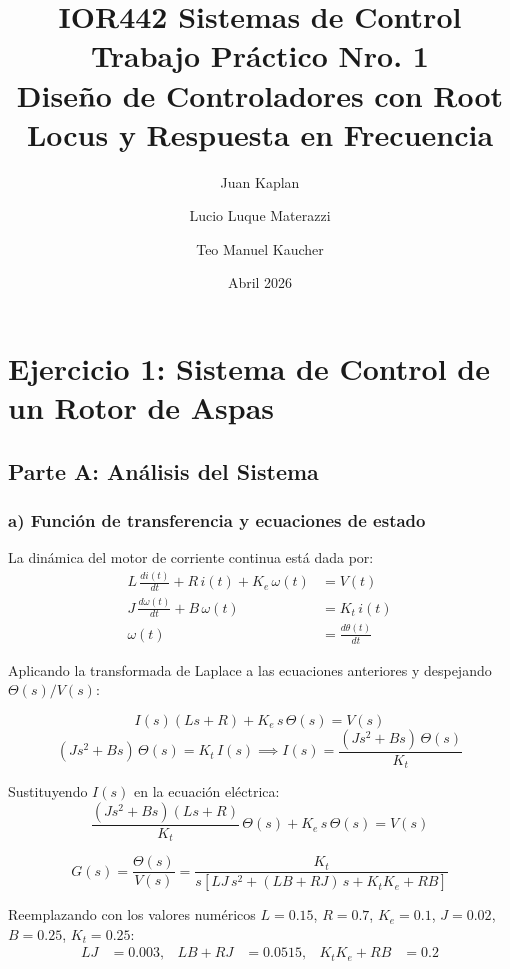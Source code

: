 \documentclass[12pt,a4paper]{article}
\title{
  \large IOR442 Sistemas de Control\\[0.5em]
  \Large \textbf{Trabajo Práctico Nro. 1}\\[0.3em]
  \large Diseño de Controladores con Root Locus y Respuesta en Frecuencia
}
\author{
  Juan Kaplan \and Lucio Luque Materazzi \and Teo Manuel Kaucher
}
\date{Abril 2026}
\begin{document}
\maketitle
\tableofcontents
\newpage

\section{Ejercicio 1: Sistema de Control de un Rotor de Aspas}

\subsection{Parte A: Análisis del Sistema}

\subsubsection*{a) Función de transferencia y ecuaciones de estado}

La dinámica del motor de corriente continua está dada por:
\begin{align}
  L\,\frac{di(t)}{dt} + R\,i(t) + K_e\,\omega(t) &= V(t) \label{eq:elec}\\
  J\,\frac{d\omega(t)}{dt} + B\,\omega(t) &= K_t\,i(t) \label{eq:mec}\\
  \omega(t) &= \frac{d\theta(t)}{dt} \label{eq:kinem}
\end{align}

Aplicando la transformada de Laplace a las ecuaciones anteriores y despejando $\Theta(s)/V(s)$:

\[
  I(s)(Ls + R) + K_e\,s\,\Theta(s) = V(s)
\]
\[
  (Js^2 + Bs)\,\Theta(s) = K_t\,I(s) \implies I(s) = \frac{(Js^2+Bs)\,\Theta(s)}{K_t}
\]

Sustituyendo $I(s)$ en la ecuación eléctrica:
\[
  \frac{(Js^2+Bs)(Ls+R)}{K_t}\,\Theta(s) + K_e\,s\,\Theta(s) = V(s)
\]

\[
  \boxed{G(s) = \frac{\Theta(s)}{V(s)} = \frac{K_t}{s\!\left[LJ\,s^2 + (LB+RJ)\,s + K_tK_e + RB\right]}}
\]

Reemplazando con los valores numéricos $L=0.15$, $R=0.7$, $K_e=0.1$, $J=0.02$, $B=0.25$, $K_t=0.25$:
\begin{align*}
  LJ &= 0.003, &
  LB+RJ &= 0.0515, &
  K_tK_e + RB &= 0.2
\end{align*}
\end{document}
